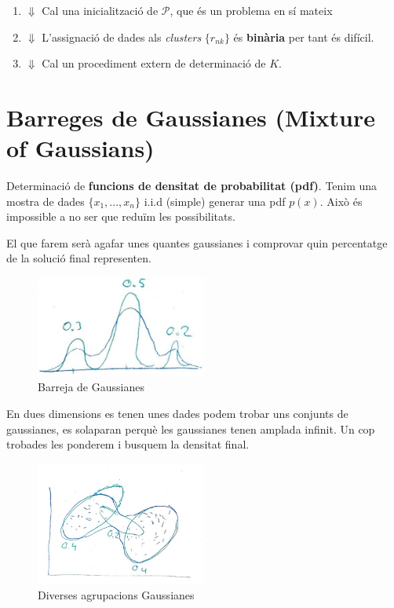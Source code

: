 \begin{enumerate}
	\item $\Downarrow$ Cal una inicialització de $\mathcal{P}$, que és un problema en sí mateix
	\item $\Downarrow$ L'assignació de dades als \emph{clusters} $\{r_{nk}\}$ és \textbf{binària} per tant és difícil.
	\item $\Downarrow$ Cal un procediment extern de determinació de $K$.
\end{enumerate}

\section{Barreges de Gaussianes (Mixture of Gaussians)}

Determinació de \textbf{funcions de densitat de probabilitat (pdf)}. Tenim una mostra de dades  $\{x_1,...,x_n\}$ i.i.d (simple) generar una pdf $p(x)$. Això és impossible a no ser que reduïm les possibilitats.

El que farem serà agafar unes quantes gaussianes i comprovar quin percentatge de la solució final representen.

\begin{figure}[H]
    \centering
    \includegraphics[width=0.5\textwidth]{tema_3/images/figura_5}
    \caption{Barreja de Gaussianes}
\end{figure}

En dues dimensions es tenen unes dades podem trobar uns conjunts de gaussianes, es solaparan perquè les gaussianes tenen amplada infinit. Un cop trobades les ponderem i busquem la densitat final.

\begin{figure}[H]
    \centering
    \includegraphics[width=0.5\textwidth]{tema_3/images/figura_6}
    \caption{Diverses agrupacions Gaussianes}
\end{figure}

